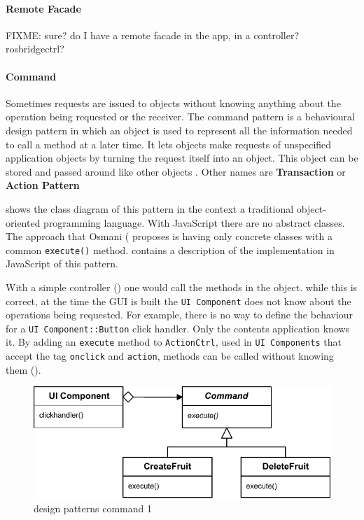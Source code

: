 \paragraph{Remote Facade} FIXME: sure? do I have a remote facade in the app, in a controller? rosbridgectrl?

\paragraph{Command} 
Sometimes requests are issued to objects without knowing anything about the operation being requested or the receiver.
The command pattern is a behavioural design pattern in which an object is used to represent all the information needed to call a method at a later time. 
It lets objects make requests of unspecified application objects by turning the request itself into an object.
This object can be stored and passed around like other objects \cite{GoF:1995}.
Other names are \textbf{Transaction} or \textbf{Action Pattern}  

 shows the class diagram of this pattern in the context a traditional object-oriented programming language.
With JavaScript there are no abstract classes.
The approach that Osmani (\cite{Osmani:2012} proposes is having only concrete classes with a common \texttt{execute()} method.
 contains a description of the implementation in JavaScript of this pattern.


With a simple controller () one would call the methods in the object.
while this is correct, at the time the \ac{GUI} is built the \texttt{UI Component} does not know about the operations being requested.
For example, there is no way to define the behaviour for a \texttt{UI Component::Button} click handler.
Only the contents application knows it.
By adding an \texttt{execute} method to \texttt{ActionCtrl}, used in \texttt{UI Components} that accept the tag \texttt{onclick} and \texttt{action}, methods can be called without knowing them ().

\begin{figure}[htb]
    \centering
    \includegraphics{figures/design-patterns-command-1.pdf}
    \caption{design patterns command 1}
    \label{fig:design-command-general}
\end{figure}

